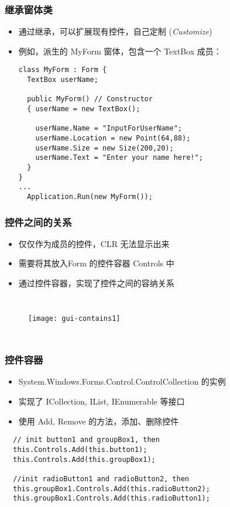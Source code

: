 \begin{frame}[fragile]
\frametitle{继承窗体类}
\begin{itemize}
\item 通过继承，可以扩展现有控件，自己定制 (\textit{Customize})
\item 例如，派生的 MyForm 窗体，包含一个 TextBox 成员：
\begin{lstlisting}
class MyForm : Form {
  TextBox userName;
  
  public MyForm() // Constructor
  { userName = new TextBox();

    userName.Name = "InputForUserName";
    userName.Location = new Point(64,88);
    userName.Size = new Size(200,20);
    userName.Text = "Enter your name here!";
  }
}
...
  Application.Run(new MyForm());
\end{lstlisting}
\end{itemize}
\end{frame}

\begin{frame}
\frametitle{控件之间的关系}
\begin{itemize}
\item 仅仅作为成员的控件，CLR 无法显示出来
\item 需要将其放入Form 的{\redwarn 控件容器} Controls 中
\item 通过控件容器，实现了控件之间的容纳关系
\end{itemize}
\begin{columns}[t]
  \begin{figure}[htbp]
    \centering
    \texttt{[image: gui-contains1]}
  \end{figure}
  
\end{columns}
\end{frame}

\begin{frame}[fragile]
\frametitle{控件容器}
\begin{itemize}
\item System.Windows.Forms.Control.ControlCollection 的实例
\item 实现了 ICollection, IList, IEnumerable 等接口
\item 使用 Add, Remove 的方法，添加、删除控件
\end{itemize}
\begin{lstlisting}
  // init button1 and groupBox1, then 
  this.Controls.Add(this.button1);
  this.Controls.Add(this.groupBox1);

  //init radioButton1 and radioButton2, then
  this.groupBox1.Controls.Add(this.radioButton2);
  this.groupBox1.Controls.Add(this.radioButton1);
\end{lstlisting}
\end{frame}

